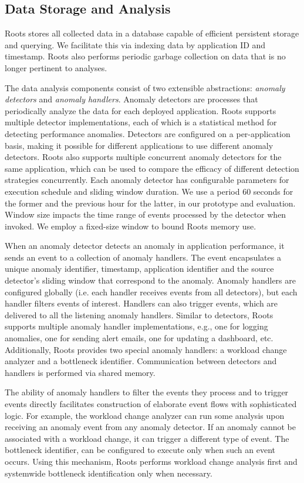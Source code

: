 \subsection{Data Storage and Analysis}

Roots stores all collected data in a database capable of 
efficient persistent storage
and querying. We facilitate this via indexing
data by application ID and timestamp.
Roots also performs periodic garbage collection on data that is no longer
pertinent to analyses.

The data analysis components consist of two extensible
abstractions: \textit{anomaly detectors} 
and \textit{anomaly handlers}.
Anomaly detectors are processes that periodically 
analyze the data for
each deployed application. 
Roots supports multiple detector implementations, 
each of which is a statistical method for detecting 
performance anomalies. Detectors are configured
on a per-application basis, making it possible for different applications to use different anomaly 
detectors. Roots also supports multiple concurrent anomaly detectors for 
the same application, which can be used
to compare the efficacy of different detection strategies concurrently.
Each anomaly detector has configurable parameters for execution schedule 
and sliding window duration.
We use a period 60 seconds for the former and the previous
hour for the latter, in our prototype and evaluation.
Window size impacts the time range of events processed
by the detector when invoked.
We employ a fixed-size window to bound Roots memory use.

When an anomaly detector detects an anomaly 
in application performance, it sends an event
to a collection of anomaly handlers. 
The event encapsulates a unique anomaly identifier, 
timestamp, application identifier and the source detector's sliding window that correspond to the
anomaly. Anomaly handlers are configured globally (i.e. each handler
receives events from all detectors), but each handler filters events
of interest.
Handlers can also trigger events, which are delivered to
all the listening anomaly handlers. Similar to detectors, 
Roots supports multiple anomaly handler
implementations, e.g., one for logging anomalies, one for sending alert emails, one
for updating a dashboard, etc. 
Additionally, Roots provides two special anomaly handlers:
a workload change analyzer and a bottleneck identifier.
Communication between detectors and handlers 
is performed via shared memory.

The ability of anomaly handlers to filter the events they 
process and to trigger events directly
facilitates construction of 
elaborate event flows with sophisticated logic. For example, the workload
change analyzer can run some analysis upon receiving an anomaly event
from any anomaly detector. If an anomaly cannot be associated 
with a workload
change, it can trigger a different type of event. 
The bottleneck identifier, can
be configured to execute only when such an event occurs.
Using this mechanism, Roots performs workload change analysis first
and systemwide bottleneck identification only when necessary.

